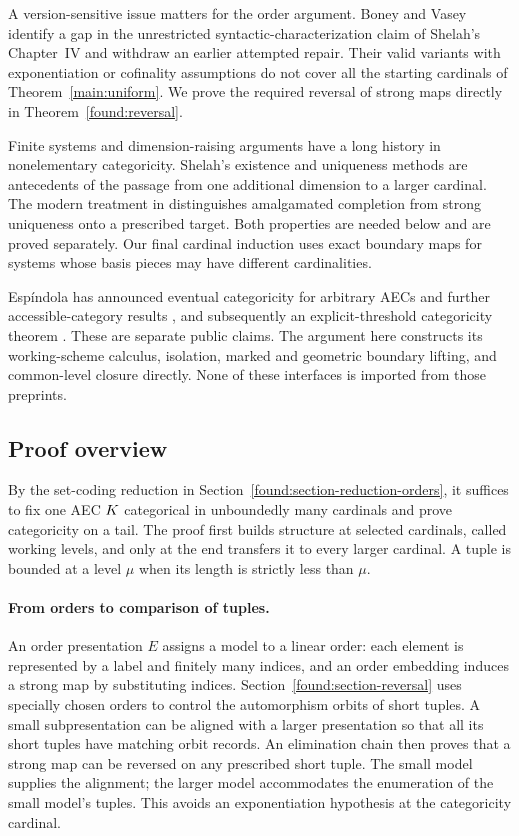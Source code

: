 A version-sensitive issue matters for the order argument.  Boney and
Vasey \cite[Fact~1.4 and the discussion of Claim~1.5, pp.~3--4]{BoneyVasey2015}
identify a gap in the unrestricted syntactic-characterization claim of
Shelah's Chapter~IV and withdraw an earlier attempted repair.  Their
valid variants with exponentiation or cofinality assumptions do not
cover all the starting cardinals of Theorem~\ref{main:uniform}.  We prove
the required reversal of strong maps directly in
Theorem~\ref{found:reversal}.

Finite systems and dimension-raising arguments have a long history in
nonelementary categoricity.  Shelah's existence and uniqueness methods
\cite[Sections~3--5]{Shelah1983B} are antecedents of the passage from
one additional dimension to a larger cardinal.  The modern treatment in
\cite[Definition~8.16 and Lemma~11.6]{ShelahVasey2024} distinguishes
amalgamated completion from strong uniqueness onto a prescribed target.
Both properties are needed below and are proved separately.  Our final
cardinal induction uses exact boundary maps for systems whose basis
pieces may have different cardinalities.

Esp\'indola has announced eventual categoricity for arbitrary AECs and
further accessible-category results \cite{Espindola2019}, and subsequently
an explicit-threshold categoricity theorem \cite[Theorem~4.1]{Espindola2023}.
These are separate public claims.  The argument here constructs its
working-scheme calculus, isolation, marked and geometric boundary lifting,
and common-level closure directly.  None of these interfaces is imported
from those preprints.

\subsection{Proof overview}

By the set-coding reduction in Section~\ref{found:section-reduction-orders},
it suffices to fix one AEC $K$ categorical in unboundedly many cardinals
and prove categoricity on a tail.  The proof first builds structure at
selected cardinals, called working levels, and only at the end transfers
it to every larger cardinal.  A tuple is bounded at a level $\mu$ when
its length is strictly less than $\mu$.

\paragraph{From orders to comparison of tuples.}
An order presentation $E$ assigns a model to a linear order: each element
is represented by a label and finitely many indices, and an order embedding
induces a strong map by substituting indices.  Section~\ref{found:section-reversal}
uses specially chosen orders to control the automorphism orbits of short
tuples.  A small subpresentation can be aligned with a larger presentation
so that all its short tuples have matching orbit records.  An elimination
chain then proves that a strong map can be reversed on any prescribed
short tuple.  The small model supplies the alignment; the larger model
accommodates the enumeration of the small model's tuples.  This avoids an
exponentiation hypothesis at the categoricity cardinal.

